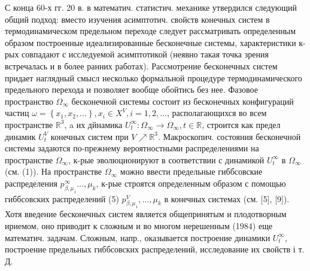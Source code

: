 \documentclass[10pt]{article}
\begin{document}
С конца 60-х гг. 20 в. в математич. статистич. механике утвердился следующий общий подход: вместо изучения асимптотич. свойств конечных систем в термодинамическом предельном переходе следует рассматривать определенным образом построенные идеализированные бесконечные системы, характеристики к-рых совпадают с исследуемой асимптотикой (неявно такая точка зрения встречалась и в более ранних работах). Рассмотрение бесконечных систем придает наглядный смысл несколько формальной процедуре термодинамического предельного перехода и позволяет вообще обойтись без нее. Фазовое пространство $\Omega_{\infty}$ бесконечной системы состоит из бесконечных конфигураций частиц $\omega=\left\{x_{1}, x_{2}, \ldots\right\}, x_{i} \in X^{V}, i=1,2, \ldots$, располагающихся во всем пространстве $\mathbb{R}^{3}$, a их дйнамика $U_{t}^{\infty}: \Omega_{\infty} \rightarrow \Omega_{\infty}, t \in \mathbb{R}$, строится как предел динамик $U_{t}^{V}$ конечных систем при $V \nearrow \mathbb{R}^{3}$. Макроскопич. состояния бесконечной системы задаются по-прежнему вероятностными распределениями на пространстве $\Omega_{\infty}$, к-рые эволюционируют в соответствии с динамикой $U_{t}^{\infty}$ в $\Omega_{\infty}$ (см. (1)). На пространстве $\Omega_{\infty}$ можно ввести предельные гиббсовские распределения $p_{\beta, \mu_{1}}^{\infty} \ldots, \mu_{k}$, к-рые строятся определенным образом с помощью гиббсовских распределений (5) $p_{\beta, \mu_{1}}^{V}, \ldots, \mu_{k}$ в конечных системах (см. [5], [9]). Хотя введение бесконечных систем является общепринятым и плодотворным ириемом, оно приводит к сложным и во многом нерешенным (1984) еще математич. задачам. Сложным, напр., оказывается построение динамики $U_{t}^{\infty}$, построение предельных гиббсовских распределений, исследование их свойств і т. Д.
\end{document}
